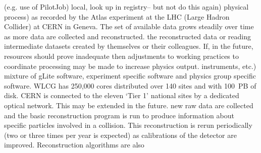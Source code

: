 \documentclass[times]{cpeauth}
\begin{document}
%
%
(e.g. use of PilotJob)
local, look up in registry-- but not do this again)
%
%
%
%
physical process) as recorded by the Atlas experiment at the LHC (Large Hadron
Collider) at CERN in Geneva. The set of available data grows steadily over time
as more data are collected and reconstructed.
%
%
the reconstructed data or reading intermediate datasets created by themselves or
their colleagues. If, in the future, resources should prove inadequate then
adjustments to working practices to coordinate processing may be made to
increase physics output.
%
instruments, etc.)
%
mixture of gLite software, experiment specific software and physics group
specific software. WLCG has 250,000 cores distributed over 140 sites and with
100~PB of disk. CERN is connected to the eleven `Tier 1' national sites by a
dedicated optical network. This may be extended in the future.
%
%
new raw data are collected and the basic reconstruction program is run to
produce information about specific particles involved in a collision. This
reconstruction is rerun periodically (two or three times per year is expected)
as calibrations of the detector are improved. Reconstruction algorithms are also
\end{document}
